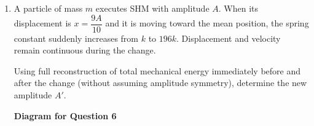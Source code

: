 \documentclass[12pt]{article}
\begin{document}
\begin{enumerate}
Determine the final pressure drop $P_0-P_f$ in terms of $\rho v_0^2$.


\begin{center}
\textbf{Diagram for Question 5}
\end{center}


(A) $\dfrac{390624}{2}\rho v_0^2$ 

(B) $390624\rho v_0^2$  

(C) $\dfrac{390625}{2}\rho v_0^2$  

(D) $390625\rho v_0^2$  

\item A particle of mass $m$ executes SHM with amplitude $A$. When its displacement is $x=\dfrac{9A}{10}$ and it is moving toward the mean position, the spring constant suddenly increases from $k$ to $196k$. Displacement and velocity remain continuous during the change.

Using full reconstruction of total mechanical energy immediately before and after the change (without assuming amplitude symmetry), determine the new amplitude $A'$.


\begin{center}
\textbf{Diagram for Question 6}
\end{center}

\end{enumerate}
\end{document}
